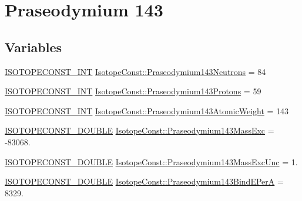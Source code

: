 \hypertarget{group___isotope_const-_praseodymium-_pr143}{}\section{Praseodymium 143}
\label{group___isotope_const-_praseodymium-_pr143}
\subsection*{Variables}
\begin{DoxyCompactItemize}
\item 
\mbox{\hyperlink{group___isotope_const-_macros_ga5f18360b3e99483a35c32d789e62621c}{I\+S\+O\+T\+O\+P\+E\+C\+O\+N\+S\+T\+\_\+\+I\+NT}} \mbox{\hyperlink{group___isotope_const-_praseodymium-_pr143_gaf810994cf882241f8cd4736ec8617868}{Isotope\+Const\+::\+Praseodymium143\+Neutrons}} = 84
\item 
\mbox{\hyperlink{group___isotope_const-_macros_ga5f18360b3e99483a35c32d789e62621c}{I\+S\+O\+T\+O\+P\+E\+C\+O\+N\+S\+T\+\_\+\+I\+NT}} \mbox{\hyperlink{group___isotope_const-_praseodymium-_pr143_ga407ceeeb85fabc3b2f85cd2045eda0c6}{Isotope\+Const\+::\+Praseodymium143\+Protons}} = 59
\item 
\mbox{\hyperlink{group___isotope_const-_macros_ga5f18360b3e99483a35c32d789e62621c}{I\+S\+O\+T\+O\+P\+E\+C\+O\+N\+S\+T\+\_\+\+I\+NT}} \mbox{\hyperlink{group___isotope_const-_praseodymium-_pr143_gac25b4726ce1f06625e4b42d4e3b36a26}{Isotope\+Const\+::\+Praseodymium143\+Atomic\+Weight}} = 143
\item 
\mbox{\hyperlink{group___isotope_const-_macros_ga8f45a7272ce02c0b4c65c44636ed719a}{I\+S\+O\+T\+O\+P\+E\+C\+O\+N\+S\+T\+\_\+\+D\+O\+U\+B\+LE}} \mbox{\hyperlink{group___isotope_const-_praseodymium-_pr143_gaf2ab4fb5c658b458da0a58eb0b01cd7a}{Isotope\+Const\+::\+Praseodymium143\+Mass\+Exc}} = -\/83068.
\item 
\mbox{\hyperlink{group___isotope_const-_macros_ga8f45a7272ce02c0b4c65c44636ed719a}{I\+S\+O\+T\+O\+P\+E\+C\+O\+N\+S\+T\+\_\+\+D\+O\+U\+B\+LE}} \mbox{\hyperlink{group___isotope_const-_praseodymium-_pr143_ga43679aaf211759bbc4f3909269b0e7c1}{Isotope\+Const\+::\+Praseodymium143\+Mass\+Exc\+Unc}} = 1.
\item 
\mbox{\hyperlink{group___isotope_const-_macros_ga8f45a7272ce02c0b4c65c44636ed719a}{I\+S\+O\+T\+O\+P\+E\+C\+O\+N\+S\+T\+\_\+\+D\+O\+U\+B\+LE}} \mbox{\hyperlink{group___isotope_const-_praseodymium-_pr143_gac5e97313907858f5235b33ae578b54e1}{Isotope\+Const\+::\+Praseodymium143\+Bind\+E\+PerA}} = 8329.

\end{DoxyCompactItemize}
